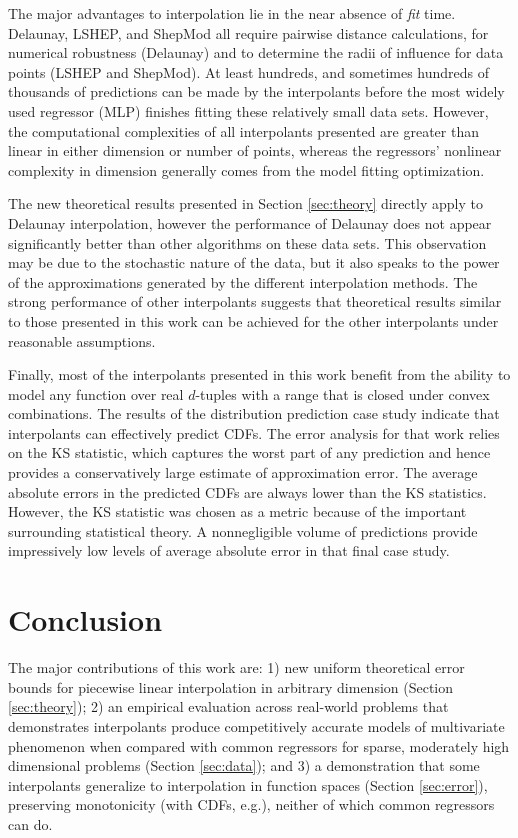 \documentclass[smallextended,final]{svjour3}  %
\begin{document}
The major advantages to interpolation lie in the near absence of
\textit{fit} time. Delaunay, LSHEP, and ShepMod all require pairwise
distance calculations, for numerical robustness (Delaunay) and to
determine the radii of influence for data points (LSHEP and
ShepMod). At least hundreds, and sometimes hundreds of thousands of
predictions can be made by the interpolants before the most widely
used regressor (MLP) finishes fitting these relatively small data
sets.  However, the computational complexities of all interpolants
presented are greater than linear in either dimension or number of
points, whereas the regressors' nonlinear complexity in dimension
generally comes from the model fitting optimization.

The new theoretical results presented in Section \ref{sec:theory}
directly apply to Delaunay interpolation, however the performance of
Delaunay does not appear significantly better than other algorithms on
these data sets.  This observation may be due to the stochastic nature
of the data, but it also speaks to the power of the approximations
generated by the different interpolation methods.  The strong
performance of other interpolants suggests that theoretical results
similar to those presented in this work can be achieved for the other
interpolants under reasonable assumptions.

Finally, most of the interpolants presented in this work benefit from
the ability to model any function over real $d$-tuples with a range
that is closed under convex combinations. The results of the
distribution prediction case study indicate that interpolants can
effectively predict CDFs. The error analysis for that work relies on
the KS statistic, which captures the worst part of any prediction and
hence provides a conservatively large estimate of approximation
error. The average absolute errors in the predicted CDFs are always
lower than the KS statistics. However, the KS statistic was chosen as
a metric because of the important surrounding statistical theory. A
nonnegligible volume of predictions provide impressively low levels of
average absolute error in that final case study.



\section{Conclusion}
\label{sec:conclusion}

The major contributions of this work are: 1) new uniform theoretical
error bounds for piecewise linear interpolation in arbitrary dimension
(Section \ref{sec:theory}); 2) an empirical evaluation across
real-world problems that demonstrates interpolants produce
competitively accurate models of multivariate phenomenon when compared
with common regressors for sparse, moderately high dimensional
problems (Section \ref{sec:data}); and 3) a demonstration that some
interpolants generalize to interpolation in function spaces (Section
\ref{sec:error}), preserving monotonicity (with CDFs, e.g.), neither
of which common regressors can do.
\end{document}

